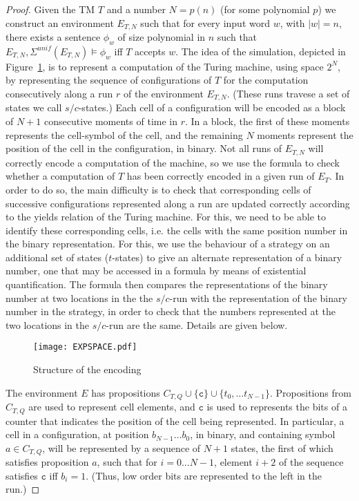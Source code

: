 \documentclass[a4wide]{article}
\theoremstyle{examplesty}
\newcommand{\Env}{E}
\newcommand{\unif}{\mathit{unif}}
\newcommand{\Strat}{\Sigma}
\begin{document}
\begin{proof}
Given the TM $T$  and a number $N = p(n)$ 
(for some polynomial $p$) 
we construct an environment $\Env_{T,N}$ such that
for every input word $w$, with $|w| = n$,  
there exists a sentence $\phi_w$  of size polynomial in $n$ 
such that $\Env_{T,N},\Strat^\unif(\Env_{T,N})\models \phi_w$ iff $T$ accepts $w$. 
The idea of the simulation,  
depicted in Figure~\ref{fig:EXPSPACE}, 
is to represent a 
computation 
of the Turing machine, using space $2^{N}$, 
by representing the  sequence of configurations of $T$ for the computation consecutively along a run $r$
of the environment $\Env_{T,N}$. 
(These runs travese a set of states we call $s/c$-states.) 
Each cell of a configuration will be encoded as a  block of 
$N+1$ consecutive moments of time in $r$.
In a block, the first of these moments represents the cell-symbol of the cell, and the 
remaining $N$ moments represent the position of the cell in the configuration, in binary. 
Not all runs of $\Env_{T,N}$ will correctly
encode a computation of the machine, so we use the formula to 
check whether a 
computation 
of $T$ has been correctly encoded in a given
run of $\Env_T$. 
In order to do so, the main difficulty is to check that corresponding cells of successive configurations represented along a run are updated correctly according to the 
yields relation of the Turing machine. For this, we need to be able to identify these corresponding cells, i.e. the cells with the same position number in the binary representation. 
For this, we use the behaviour of a strategy on an additional set of states ($t$-states) to give an alternate representation of a binary number, 
one that may be accessed in a formula by means of existential quantification. The formula then compares the representations of the binary number at two locations in the 
the $s/c$-run with the representation of the binary number in the strategy, in order to check that the numbers represented at the two locations in the $s/c$-run are the same. 
Details are given below. 


\begin{figure}[h]  
\centerline{\texttt{[image: EXPSPACE.pdf]} } 
\caption{Structure of the encoding
\label{fig:EXPSPACE}}
\end{figure} 

\newcommand{\cbit}{\mathtt{c}} 

The environment $\Env$ has propositions 
$C_{T,Q}\cup \{\cbit\}\cup \{t_0, \ldots t_{N-1}\}$.  
Propositions from 
$C_{T,Q}$ are used to represent cell  elements, 
and $\cbit$ is used to represents the bits of a counter that indicates
the position of the cell being represented. In particular, 
 a cell in a configuration,  at position 
$b_{N-1}\ldots b_{0}$, in binary, and containing symbol 
$a\in C_{T,Q}$, 
will be represented by a sequence of $N+1$ states,  
the first of which satisfies proposition $a$, such that for $i = 0\ldots N-1$, 
element $i+2$ of the sequence satisfies $\cbit$ iff $b_i =1$. 
(Thus, low order bits are represented to the left in the run.) 


\end{proof}
\end{document}
